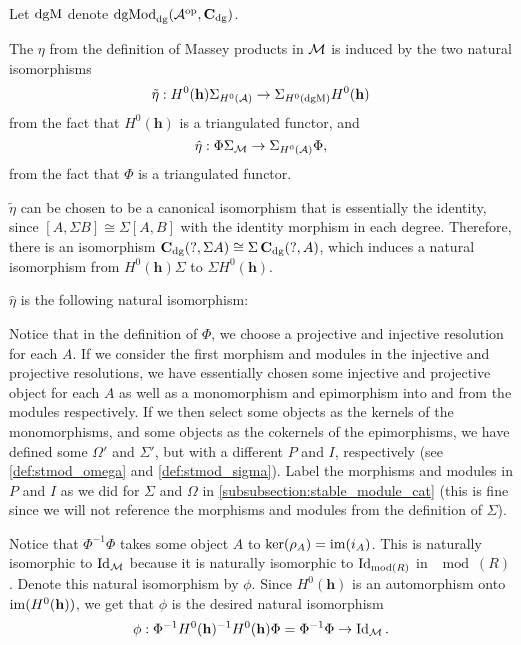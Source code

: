 \begin{remark}
    Let \( \operatorname{dgM} \) denote \( \operatorname{dgMod}_{\operatorname{dg}}({\mathcal{A}}^{\operatorname{op}}, \operatorname{\mathbf{C}}_{\operatorname{dg}}) \).

    The \( \eta \) from the definition of Massey products in \( {\mathcal{M}} \) is induced by the two natural isomorphisms
    \[
        \tilde{\eta}: H^0(\mathbf{h}) \Sigma_{H^0({\mathcal{A}})} \to \Sigma_{H^0(\operatorname{dgM})} H^0(\mathbf{h})
    \]
    from the fact that \( H^0(\mathbf{h}) \) is a triangulated functor, and
    \[
        \hat{\eta}: \Phi \Sigma_{{\mathcal{M}}} \to \Sigma_{H^0({\mathcal{A}})} \Phi,
    \]
    from the fact that \( \Phi \) is a triangulated functor.

    \( \tilde{\eta} \) can be chosen to be a canonical isomorphism that is essentially the identity, since \( [A, \Sigma B] \cong \Sigma [A, B] \) with the identity morphism in each degree. Therefore, there is an isomorphism \( \operatorname{\mathbf{C}}_{\operatorname{dg}}(?, \Sigma A) \cong \Sigma \operatorname{\mathbf{C}}_{\operatorname{dg}}(?, A) \), which induces a natural isomorphism from \( H^0(\mathbf{h}) \Sigma \) to \( \Sigma H^0(\mathbf{h}) \).

    \( \hat{\eta} \) is the following natural isomorphism:

    Notice that in the definition of \( \Phi \), we choose a projective and injective resolution for each \( A \). If we consider the first morphism and modules in the injective and projective resolutions, we have essentially chosen some injective and projective object for each \( A \) as well as a monomorphism and epimorphism into and from the modules respectively. If we then select some objects as the kernels of the monomorphisms, and some objects as the cokernels of the epimorphisms, we have defined some \( \Omega' \) and \( \Sigma' \), but with a different \( P \) and \( I \), respectively (see \autoref{def:stmod_omega} and \autoref{def:stmod_sigma}). Label the morphisms and modules in \( P \) and \( I \) as we did for \( \Sigma \) and \( \Omega \) in \autoref{subsubsection:stable_module_cat} (this is fine since we will not reference the morphisms and modules from the definition of \( \Sigma \)).

    Notice that \( \Phi^{-1} \Phi \) takes some object \( A \) to \( \ker(\rho_A) = \operatorname{im}(i_A) \). This is naturally isomorphic to \( \operatorname{Id}_{{\mathcal{M}}} \) because it is naturally isomorphic to \( \operatorname{Id}_{\operatorname{mod}(R)} \) in \( \mod(R) \). Denote this natural isomorphism by \( \phi \). Since \( H^0(\mathbf{h}) \) is an automorphism onto \( \operatorname{im}(H^0(\mathbf{h})) \), we get that \( \phi \) is the desired natural isomorphism
    \[
        \phi: \Phi^{-1} H^0(\mathbf{h})^{-1} H^0(\mathbf{h}) \Phi = \Phi^{-1} \Phi \to \operatorname{Id}_{{\mathcal{M}}}.
    \]
    

\end{remark}
